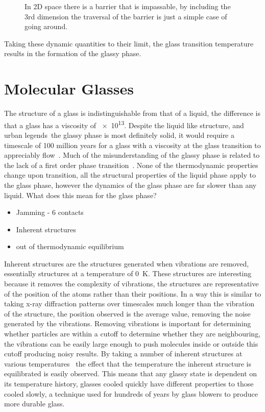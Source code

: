 \begin{figure}
    \centering
    \caption{In 2D space there is a barrier that is impassable, by including the 3rd dimension the traversal of the barrier is just a simple case of going around.}
    \label{fig:barrier dimensions}
\end{figure}

Taking these dynamic quantities to their limit, the glass transition temperature results in the formation of the glassy phase.


\section{Molecular Glasses}

The structure of a glass is indistinguishable from that of a liquid, the difference is that a glass has a viscosity of \SI{e13}{\poise}. Despite the liquid like structure, and urban legends~\tocite the glassy phase is most definitely solid, it would require a timescale of 100 million years for a glass with a viscosity at the glass transition to appreciably flow~\tocite. Much of the misunderstanding of the glassy phase is related to the lack of a first order phase transition~\tocite. None of the thermodynamic properties change upon transition, all the structural properties of the liquid phase apply to the glass phase, however the dynamics of the glass phase are far slower than any liquid. What does this mean for the glass phase? 

\begin{itemize}
    \item Jamming - 6 contacts
    \item Inherent structures
    \item out of thermodynamic equilibrium
\end{itemize}

Inherent structures are the structures generated when vibrations are removed, essentially structures at a temperature of \SI{0}{\kelvin}. These structures are interesting because it removes the complexity of vibrations, the structures are representative of the position of the atoms rather than their positions. In a way this is similar to taking x-ray diffraction patterns over timescales much longer than the vibration of the structure, the position observed is the average value, removing the noise generated by the vibrations. Removing vibrations is important for determining whether particles are within a cutoff to determine whether they are neighbouring, the vibrations can be easily large enough to push molecules inside or outside this cutoff producing noisy results. By taking a number of inherent structures at various temperatures~ the effect that the temperature the inherent structure is equilibrated is easily observed. This means that any glassy state is dependent on its temperature history, glasses cooled quickly have different properties to those cooled slowly, a technique used for hundreds of years by glass blowers to produce more durable glass\tocite.


